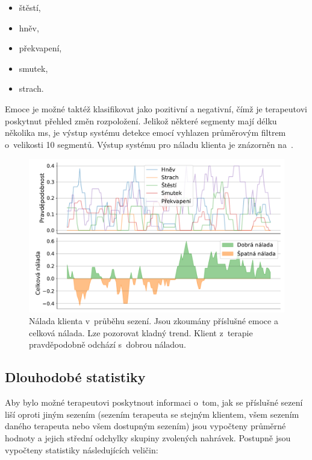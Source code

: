 \begin{itemize}
    \item štěstí,
    \item hněv,
    \item překvapení,
    \item smutek,
    \item strach.
\end{itemize}

Emoce je možné taktéž klasifikovat jako pozitivní a negativní, čímž je terapeutovi poskytnut přehled změn rozpoložení. Jelikož některé segmenty mají délku několika ms, je výstup systému detekce emocí vyhlazen průměrovým filtrem o~velikosti 10 segmentů. Výstup systému pro náladu klienta je znázorněn na~.

\begin{figure}[ht]
  \centering
  \includegraphics[width=\linewidth]{obrazky-figures/text_plots/client_mood.pdf}
  \caption{Nálada klienta v~průběhu sezení. Jsou zkoumány příslušné emoce a celková nálada. Lze pozorovat kladný trend. Klient z~terapie pravděpodobně odchází s~dobrou náladou.}
  \label{fig:Statisctics_mood}
\end{figure}


\subsection{Dlouhodobé statistiky}
Aby bylo možné terapeutovi poskytnout informaci o~tom, jak se příslušné sezení liší oproti jiným sezením (sezením terapeuta se stejným klientem, všem sezením daného terapeuta nebo všem dostupným sezením) jsou vypočteny průměrné hodnoty a jejich střední odchylky skupiny zvolených nahrávek. Postupně jsou vypočteny statistiky následujících veličin:

